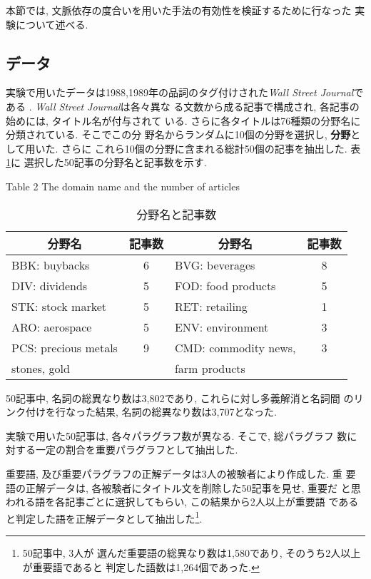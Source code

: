 本節では, 文脈依存の度合いを用いた手法の有効性を検証するために行なった
実験について述べる.


\subsection{データ}

実験で用いたデータは1988,1989年の品詞のタグ付けされた{\it Wall Street
Journal}である \cite{Brill1992}.  {\it Wall Street Journal}は各々異な
る文数から成る記事で構成され, 各記事の始めには, タイトル名が付与されて
いる.  さらに各タイトルは76種類の分野名に分類されている.  そこでこの分
野名からランダムに10個の分野を選択し, {\bf 分野}として用いた.  さらに
これら10個の分野に含まれる総計50個の記事を抽出した.  表\ref{domain}に
選択した50記事の分野名と記事数を示す.



{\footnotesize
\begin{table}[htbp]
\begin{center}
\caption{分野名と記事数} \label{domain}
\vspace*{-3mm}
Table 2 The domain name and the number of articles \\
\begin{tabular}{l|c|l|c} \hline \hline
\multicolumn{1}{c|}{分野名} &記事数  &\multicolumn{1}{c|}{分野名} &記事数 \\ \hline
BBK: buybacks &6 &BVG: beverages  &8 \\
DIV: dividends &5  &FOD: food products &5 \\
STK: stock market &5 &RET: retailing &1 \\
ARO: aerospace  &5 &ENV: environment  &3 \\
PCS: precious metals &9 &CMD: commodity news,&3  \\ 
\hspace*{11mm} stones, gold &  &\hspace*{11mm} farm products & \\ \hline
\end{tabular}
\end{center}
\end{table}
}

\noindent
50記事中, 名詞の総異なり数は3,802であり, これらに対し多義解消と名詞間
のリンク付けを行なった結果, 名詞の総異なり数は3,707となった.  

実験で用いた50記事は, 各々パラグラフ数が異なる.  そこで, 総パラグラフ
数に対する一定の割合を重要パラグラフとして抽出した.

重要語, 及び重要パラグラフの正解データは3人の被験者により作成した.  重
要語の正解データは, 各被験者にタイトル文を削除した50記事を見せ, 重要だ
と思われる語を各記事ごとに選択してもらい, この結果から2人以上が重要語
であると判定した語を正解データとして抽出した\footnote{50記事中, 3人が
選んだ重要語の総異なり数は1,580であり, そのうち2人以上が重要語であると
判定した語数は1,264個であった.}.

